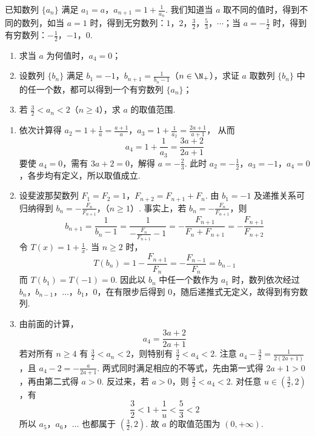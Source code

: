 \begin{problem}
已知数列 \(\{a_n\}\) 满足 \(a_1 = a\)，\(a_{n+1} = 1 + \frac{1}{a_n}\). 我们知道当 \(a\) 取不同的值时，得到不同的数列，如当 \(a = 1\) 时，得到无穷数列：\(1\)，\(2\)，\(\frac{3}{2}\)，\(\frac{5}{3}\)，\(\cdots\)；当 \(a = -\frac{1}{2}\) 时，得到有穷数列：\(-\frac{1}{2}\)，\(-1\)，\(0\).

\begin{enumerate}
\item 求当 \(a\) 为何值时，\(a_4 = 0\)；
\item 设数列 \(\{b_n\}\) 满足 \(b_1 = -1\)，\(b_{n+1} = \frac{1}{b_n - 1}\)（\(n \in \N_+\)），求证 \(a\) 取数列 \(\{b_n\}\) 中的任一个数，都可以得到一个有穷数列 \(\{a_n\}\)；
\item 若 \(\frac{3}{2} < a_n < 2\)（\(n \geqslant 4\)），求 \(a\) 的取值范围.
\end{enumerate}
\end{problem}


\begin{solution}
\begin{enumerate}
\item 依次计算得
\(a_2=1+\frac{1}{a}=\frac{a+1}{a}\)，\(a_3=1+\frac{1}{a_2}=\frac{2a+1}{a+1}\)，
从而
\[
a_4=1+\frac{1}{a_3}=\frac{3a+2}{2a+1}
\]
要使 \(a_4=0\)，需有 \(3a+2=0\)，解得 \(a=-\frac{2}{3}\). 此时 \(a_2=-\frac{1}{2}\)，\(a_3=-1\)，\(a_4=0\)，各步均有定义，所以取值成立.
\item 设斐波那契数列 \(F_1=F_2=1\)，\(F_{n+2}=F_{n+1}+F_n\). 由 \(b_1=-1\) 及递推关系可归纳得到
\(b_n=-\frac{F_n}{F_{n+1}}\)，（\(n\geqslant1\)）.
事实上，若 \(b_n=-\frac{F_n}{F_{n+1}}\)，则
\[
b_{n+1}=\frac{1}{b_n-1}
=\frac{1}{-\frac{F_n}{F_{n+1}}-1}
=-\frac{F_{n+1}}{F_n+F_{n+1}}
=-\frac{F_{n+1}}{F_{n+2}}
\]
令 \(T(x)=1+\frac{1}{x}\). 当 \(n\geqslant2\) 时，
\[
T(b_n)=1-\frac{F_{n+1}}{F_n}
=-\frac{F_{n-1}}{F_n}=b_{n-1}
\]
而 \(T(b_1)=T(-1)=0\). 因此以 \(b_n\) 中任一个数作为 \(a_1\) 时，数列依次经过 \(b_n\)，\(b_{n-1}\)，\(\ldots\)，\(b_1\)，\(0\)，在有限步后得到 \(0\)，随后递推式无定义，故得到有穷数列.
\item 由前面的计算，
\[
a_4=\frac{3a+2}{2a+1}
\]
若对所有 \(n\geqslant4\) 有 \(\frac{3}{2}<a_n<2\)，则特别有 \(\frac{3}{2}<a_4<2\). 注意
\(a_4-\frac{3}{2}=\frac{1}{2(2a+1)}\)，且 \(a_4-2=-\frac{a}{2a+1}\).
两式同时满足相应的不等式，先由第一式得 \(2a+1>0\)，再由第二式得 \(a>0\).
反过来，若 \(a>0\)，则 \(\frac{3}{2}<a_4<2\). 对任意 \(u\in\left(\frac{3}{2},2\right)\)，有
\[
\frac{3}{2}<1+\frac{1}{u}<\frac{5}{3}<2
\]
所以 \(a_5\)，\(a_6\)，\(\ldots\) 也都属于 \(\left(\frac{3}{2},2\right)\). 故 \(a\) 的取值范围为 \((0,+\infty)\).
\end{enumerate}
\end{solution}
